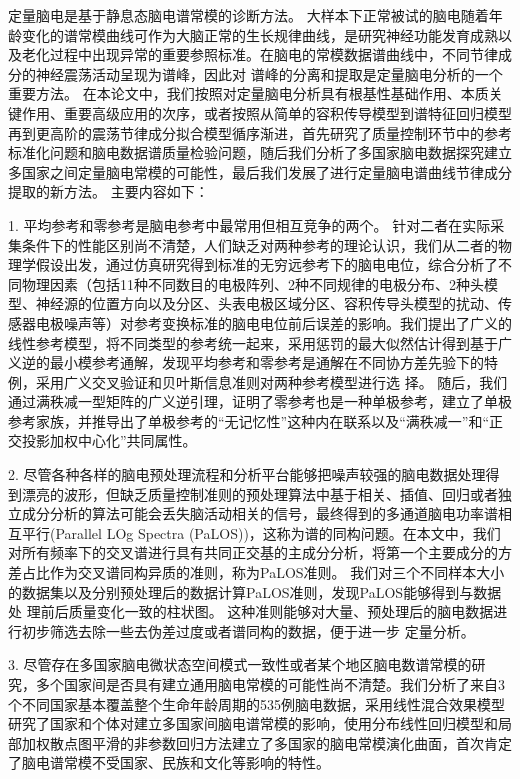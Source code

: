 \begin{chineseabstract}
定量脑电是基于静息态脑电谱常模的诊断方法。 大样本下正常被试的脑电随着年龄变化的谱常模曲线可作为大脑正常的生长规律曲线，是研究神经功能发育成熟以及老化过程中出现异常的重要参照标准。在脑电的常模数据谱曲线中，不同节律成分的神经震荡活动呈现为谱峰，因此对
谱峰的分离和提取是定量脑电分析的一个重要方法。 在本论文中，我们按照对定量脑电分析具有根基性基础作用、本质关键作用、重要高级应用的次序，或者按照从简单的容积传导模型到谱特征回归模型再到更高阶的震荡节律成分拟合模型循序渐进，首先研究了质量控制环节中的参考标准化问题和脑电数据谱质量检验问题，随后我们分析了多国家脑电数据探究建立多国家之间定量脑电常模的可能性，最后我们发展了进行定量脑电谱曲线节律成分提取的新方法。 主要内容如下：

1. 平均参考和零参考是脑电参考中最常用但相互竞争的两个。 针对二者在实际采集条件下的性能区别尚不清楚，人们缺乏对两种参考的理论认识，我们从二者的物理学假设出发，通过仿真研究得到标准的无穷远参考下的脑电电位，综合分析了不同物理因素（包括11种不同数目的电极阵列、2种不同规律的电极分布、2种头模型、神经源的位置方向以及分区、头表电极区域分区、容积传导头模型的扰动、传感器电极噪声等）对参考变换标准的脑电电位前后误差的影响。我们提出了广义的线性参考模型，将不同类型的参考统一起来，采用惩罚的最大似然估计得到基于广义逆的最小模参考通解，发现平均参考和零参考是通解在不同协方差先验下的特例，采用广义交叉验证和贝叶斯信息准则对两种参考模型进行选
择。 随后，我们通过满秩减一型矩阵的广义逆引理，证明了零参考也是一种单极参考，建立了单极参考家族，并推导出了单极参考的“无记忆性”这种内在联系以及“满秩减一”和“正交投影加权中心化”共同属性。

2. 尽管各种各样的脑电预处理流程和分析平台能够把噪声较强的脑电数据处理得到漂亮的波形，但缺乏质量控制准则的预处理算法中基于相关、插值、回归或者独立成分分析的算法可能会丢失脑活动相关的信号，最终得到的多通道脑电功率谱相互平行(Parallel LOg Spectra (PaLOS))，这称为谱的同构问题。在本文中，我们对所有频率下的交叉谱进行具有共同正交基的主成分分析，将第一个主要成分的方差占比作为交叉谱同构异质的准则，称为PaLOS准则。 我们对三个不同样本大小的数据集以及分别预处理后的数据计算PaLOS准则，发现PaLOS能够得到与数据处
理前后质量变化一致的柱状图。 这种准则能够对大量、预处理后的脑电数据进行初步筛选去除一些去伪差过度或者谱同构的数据，便于进一步
定量分析。

3. 尽管存在多国家脑电微状态空间模式一致性或者某个地区脑电数谱常模的研究，多个国家间是否具有建立通用脑电常模的可能性尚不清楚。我们分析了来自3个不同国家基本覆盖整个生命年龄周期的535例脑电数据，采用线性混合效果模型研究了国家和个体对建立多国家间脑电谱常模的影响，使用分布线性回归模型和局部加权散点图平滑的非参数回归方法建立了多国家的脑电常模演化曲面，首次肯定了脑电谱常模不受国家、民族和文化等影响的特性。


\end{chineseabstract}
